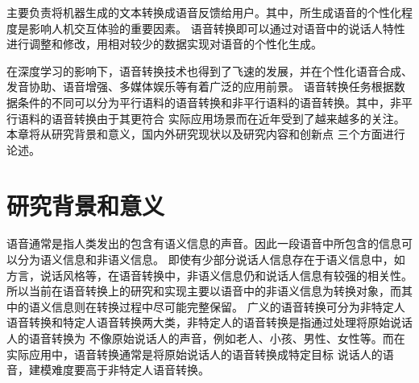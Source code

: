 
主要负责将机器生成的文本转换成语音反馈给用户。其中，所生成语音的个性化程度是影响人机交互体验的重要因素。
语音转换即可以通过对语音中的说话人特性进行调整和修改，用相对较少的数据实现对语音的个性化生成。

在深度学习的影响下，语音转换技术也得到了飞速的发展，并在个性化语音合成、发音协助、语音增强、多媒体娱乐等有着广泛的应用前景。
语音转换任务根据数据条件的不同可以分为平行语料的语音转换和非平行语料的语音转换。其中，非平行语料的语音转换由于其更符合
实际应用场景而在近年受到了越来越多的关注。本章将从研究背景和意义，国内外研究现状以及研究内容和创新点
三个方面进行论述。

\section{研究背景和意义}
语音通常是指人类发出的包含有语义信息的声音。因此一段语音中所包含的信息可以分为语义信息和非语义信息\cite{kinnunen2010overview, 刘蕊2009发声的生理结构和嗓音的保护}。
即使有少部分说话人信息存在于语义信息中，如方言，说话风格等，在语音转换中，非语义信息仍和说话人信息有较强的相关性\cite{Nurminen12}。
所以当前在语音转换上的研究和实现主要以语音中的非语义信息为转换对象，而其中的语义信息则在转换过程中尽可能完整保留。
广义的语音转换可分为非特定人语音转换和特定人语音转换两大类，非特定人的语音转换是指通过处理将原始说话人的语音转换为
不像原始说话人的声音，例如老人、小孩、男性、女性等。而在实际应用中，语音转换通常是将原始说话人的语音转换成特定目标
说话人的语音，建模难度要高于非特定人语音转换。

